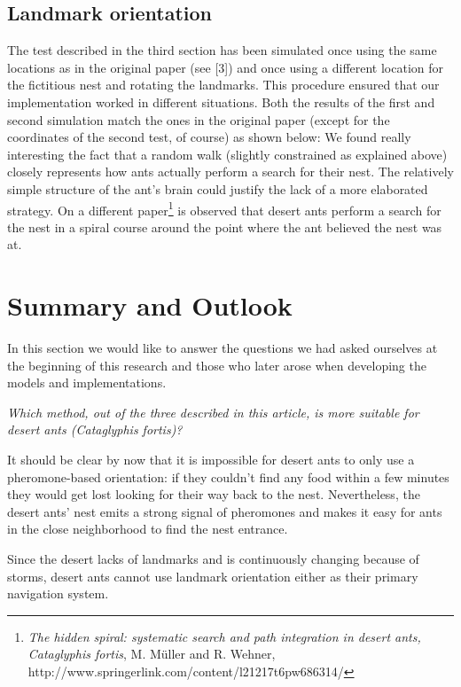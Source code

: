 \documentclass[11pt]{article}
\begin{document}
\subsection{Landmark orientation}
The test described in the third section has been simulated once using the same locations as in the original paper (see [3]) and once using a different location for the fictitious nest and rotating the landmarks. This procedure ensured that our implementation worked in different situations. Both the results of the first and second simulation match the ones in the original paper (except for the coordinates of the second test, of course) as shown below:
We found really interesting the fact that a random walk (slightly constrained as explained above) closely represents how ants actually perform a search for their nest. The relatively simple structure of the ant's brain could justify the lack of a more elaborated strategy. On a different paper\footnote{\emph{The hidden spiral: systematic search and path integration in desert ants, Cataglyphis fortis}, M. M\"{u}ller and R. Wehner, http://www.springerlink.com/content/l21217t6pw686314/} is observed that desert ants perform a search for the nest in a spiral course around the point where the ant believed the nest was at.
\section{Summary and Outlook}

In this section we would like to answer the questions we had asked ourselves at the beginning of this research and those who later arose when developing the models and implementations.

\begin{center}
	\emph{Which method, out of the three described in this article, is more suitable for desert ants (Cataglyphis fortis)?}
\end{center}
It should be clear by now that it is impossible for desert ants to only use a pheromone-based orientation: if they couldn't find any food within a few minutes they would get lost looking for their way back to the nest. Nevertheless, the desert ants' nest emits a strong signal of pheromones and makes it easy for ants in the close neighborhood to find the nest entrance.

Since the desert lacks of landmarks and is continuously changing because of storms, desert ants cannot use landmark orientation either as their primary navigation system.
\end{document}
